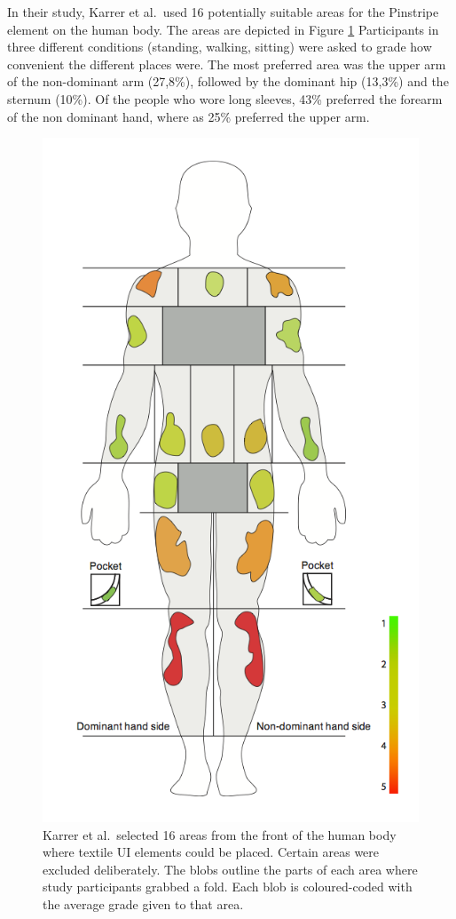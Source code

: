 In their study, Karrer et al.\ used 16 potentially suitable areas for the Pinstripe element on the human body. The areas are depicted in Figure \ref{fig:areasBody} 
Participants in three different conditions (standing, walking, sitting) were asked to grade how convenient the different places were.
The most preferred area was the upper arm of the non-dominant arm (27,8\%), followed by the dominant hip (13,3\%) and the sternum (10\%).
Of the people who wore long sleeves, 43\% preferred the forearm of the non dominant hand, where as 25\% preferred the upper arm.

\begin{figure}[!t]
	\centering
	\includegraphics[width=0.9\columnwidth]{Images/areasBody}
	\caption{Karrer et al.\ selected 16 areas from the front of the human body where textile UI elements could be placed. Certain areas were excluded deliberately. The blobs outline the parts of each area where study participants grabbed a fold. Each blob is coloured-coded with the average grade given to that area.}
	\label{fig:areasBody}
\end{figure}

